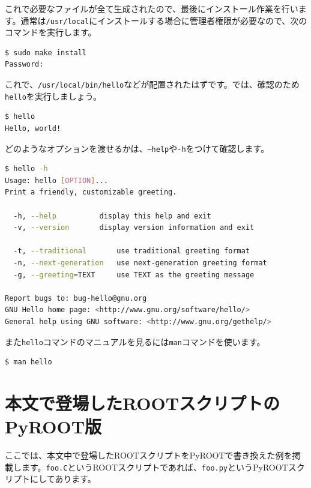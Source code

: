 これで必要なファイルが全て生成されたので、最後にインストール作業を行います。通常は\texttt{/usr/local}にインストールする場合に管理者権限が必要なので、次のコマンドを実行します。

\begin{lstlisting}[language=bash]
$ sudo make install
Password:
\end{lstlisting}

これで、\texttt{/usr/local/bin/hello}などが配置されたはずです。では、確認のため\texttt{hello}を実行しましょう。 
\begin{lstlisting}[language=bash]
$ hello
Hello, world!
\end{lstlisting}

どのようなオプションを渡せるかは、\texttt{--help}や\texttt{-h}をつけて確認します。
\begin{lstlisting}[language=bash]
$ hello -h
Usage: hello [OPTION]...
Print a friendly, customizable greeting.

  -h, --help          display this help and exit
  -v, --version       display version information and exit

  -t, --traditional       use traditional greeting format
  -n, --next-generation   use next-generation greeting format
  -g, --greeting=TEXT     use TEXT as the greeting message

Report bugs to: bug-hello@gnu.org
GNU Hello home page: <http://www.gnu.org/software/hello/>
General help using GNU software: <http://www.gnu.org/gethelp/>
\end{lstlisting}

また\texttt{hello}コマンドのマニュアルを見るには\texttt{man}コマンドを使います。

\begin{lstlisting}[language=bash]
$ man hello
\end{lstlisting}

\chapter{本文で登場したROOTスクリプトのPyROOT版}
ここでは、本文中で登場したROOTスクリプトをPyROOTで書き換えた例を掲載します。\texttt{foo.C}というROOTスクリプトであれば、\texttt{foo.py}というPyROOTスクリプトにしてあります。

\begin{NoFloat}

\end{NoFloat}
